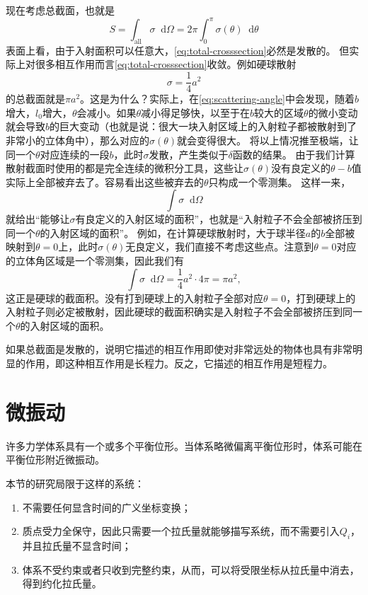 \documentclass[UTF8, a4paper]{ctexart}
\renewcommand*{\dd}{\mathop{}\!\mathrm{d}}
\begin{document}
现在考虑总截面，也就是
\begin{equation}
    S = \int_{\text{all}} \sigma \dd \Omega = 2\pi \int_0^{\pi} \sigma(\theta) \dd \theta
    \label{eq:total-crosssection}
\end{equation}
表面上看，由于入射面积可以任意大，\eqref{eq:total-crosssection}必然是发散的。
但实际上对很多相互作用而言\eqref{eq:total-crosssection}收敛。例如硬球散射
\[
    \sigma = \frac{1}{4} a^2
\]
的总截面就是$\pi a^2$。这是为什么？实际上，在\eqref{eq:scattering-angle}中会发现，随着$b$增大，$l_0$增大，$\theta$会减小。如果$\theta$减小得足够快，以至于在$b$较大的区域$\theta$的微小变动就会导致$b$的巨大变动（也就是说：很大一块入射区域上的入射粒子都被散射到了非常小的立体角中），那么对应的$\sigma(\theta)$就会变得很大。
将以上情况推至极端，让同一个$\theta$对应连续的一段$b$，此时$\sigma$发散，产生类似于$\delta$函数的结果。
由于我们计算散射截面时使用的都是完全连续的微积分工具，这些让$\sigma(\theta)$没有良定义的$\theta - b$值实际上全部被弃去了。容易看出这些被弃去的$\theta$只构成一个零测集。
这样一来，
\[
    \int \sigma \dd {\Omega}
\]
就给出“能够让$\sigma$有良定义的入射区域的面积”，也就是“入射粒子不会全部被挤压到同一个$\theta$的入射区域的面积”。
例如，在计算硬球散射时，大于球半径$a$的$b$全部被映射到$\theta=0$上，此时$\sigma(\theta)$无良定义，我们直接不考虑这些点。注意到$\theta=0$对应的立体角区域是一个零测集，因此我们有
\[
    \int \sigma \dd{\Omega} = \frac{1}{4} a^2 \cdot 4\pi = \pi a^2,
\]
这正是硬球的截面积。没有打到硬球上的入射粒子全部对应$\theta=0$，打到硬球上的入射粒子则必定被散射，因此硬球的截面积确实是入射粒子不会全部被挤压到同一个$\theta$的入射区域的面积。

如果总截面是发散的，说明它描述的相互作用即使对非常远处的物体也具有非常明显的作用，即这种相互作用是长程力。反之，它描述的相互作用是短程力。

\section{微振动}

许多力学体系具有一个或多个平衡位形。当体系略微偏离平衡位形时，体系可能在平衡位形附近微振动。

本节的研究局限于这样的系统：
\begin{enumerate}
    \item 不需要任何显含时间的广义坐标变换；
    \item 质点受力全保守，因此只需要一个拉氏量就能够描写系统，而不需要引入$Q_i$，并且拉氏量不显含时间；
    \item 体系不受约束或者只收到完整约束，从而，可以将受限坐标从拉氏量中消去，得到约化拉氏量。
\end{enumerate}
\end{document}
